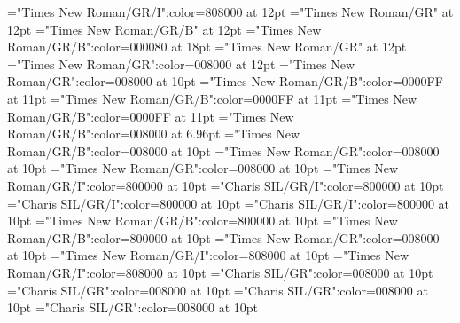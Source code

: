 \documentclass[a4paper,twoside]{article}
\begin{document}
\font\translationstes="Times New Roman/GR/I":color=808000 at 12pt
\font\spanheadwordconfigtargetconfigtargets="Times New Roman/GR" at 12pt
\font{}="Times New Roman/GR/B" at 12pt
\font{}="Times New Roman/GR/B":color=000080 at 18pt
\font{}="Times New Roman/GR" at 12pt
\font\entryletDatadicBody="Times New Roman/GR":color=008000 at 12pt
\font\spanentryletDatadicBody="Times New Roman/GR":color=008000 at 10pt
\font\spanmxbspanentryletDatadicBody="Times New Roman/GR/B":color=0000FF at 11pt
\font\aspanmxbspanentryletDatadicBody="Times New Roman/GR/B":color=0000FF at 11pt
\font\spanmainheadwordentryspanentryletDatadicBody="Times New Roman/GR/B":color=0000FF at 11pt
\font\homographnumberentryentryletDatadicBody="Times New Roman/GR/B":color=008000 at 6.96pt
\font\spanhomographnumberentryentryletDatadicBody="Times New Roman/GR/B":color=008000 at 10pt
\font\spanspanentryletDatadicBody="Times New Roman/GR":color=008000 at 10pt
\font\spanspanspanentryletDatadicBody="Times New Roman/GR":color=008000 at 10pt
\font\partofspeechspanspanspanentryletDatadicBody="Times New Roman/GR/I":color=800000 at 10pt
\font\spanespartofspeechspanspanspanentryletDatadicBody="Charis SIL/GR/I":color=800000 at 10pt
\font\spanpartofspeechmorphosyntaxanalysissharedgrammaticalinfosensesentryspanespartofspeechspanspanspanentryletDatadicBody="Charis SIL/GR/I":color=800000 at 10pt
\font\spanpartofspeechmorphosyntaxanalysissharedgrammaticalinfosensesentrypartofspeechspanspanspanentryletDatadicBody="Charis SIL/GR/I":color=800000 at 10pt
\font\sensenumbersensecontentsensessensesensecontentsensesmainentrycomplexspanspanentryletDatadicBody="Times New Roman/GR/B":color=800000 at 10pt
\font\spansensenumbersensecontentsensessensesensecontentsensesmainentrycomplexspanspanentryletDatadicBody="Times New Roman/GR/B":color=800000 at 10pt
\font\sensespanspanentryletDatadicBody="Times New Roman/GR":color=008000 at 10pt
\font{}="Times New Roman/GR/I":color=808000 at 10pt
\font{}="Times New Roman/GR/I":color=808000 at 10pt
\font{}="Charis SIL/GR":color=008000 at 10pt
\font\spansensespanspanentryletDatadicBody="Charis SIL/GR":color=008000 at 10pt
\font\spanspansensespanspanentryletDatadicBody="Charis SIL/GR":color=008000 at 10pt
\font\spanspanspansensespanspanentryletDatadicBody="Charis SIL/GR":color=008000 at 10pt
\end{document}
